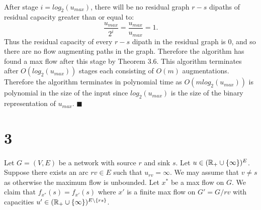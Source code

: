 \documentclass[letterpaper,12pt,oneside,onecolumn]{article}
\begin{document}
\paragraph{}
After stage $i = log_2(u_{max})$, there will be no residual graph $r-s$ dipaths of residual capacity greater than or equal to:
$$
\frac{u_{max}}{2^i} = \frac{u_{max}}{u_{max}} = 1.
$$
Thus the residual capacity of every $r-s$ dipath in the residual graph is $0$, and so there are no flow augmenting paths in the graph. Therefore the algorithm has found a max flow after this stage by Theorem $3.6$. This algorithm terminates after $O(log_2(u_{max}))$ stages each consisting of $O(m)$ augmentations. Therefore the algorithm terminates in polynomial time as $O(mlog_2(u_{max}))$ is polynomial in the size of the input since $log_2(u_{max})$ is the size of the binary representation of $u_{max}$. $\blacksquare$

\section*{3}
\paragraph{}
Let $G=(V,E)$ be a network with source $r$ and sink $s$. Let $u \in (\mathbb{R}_+ \cup \{\infty\})^E$. Suppose there exists an arc $rv \in E$ such that $u_{rv} = \infty$. We may assume that $v \neq s$ as otherwise the maximum flow is unbounded. Let $x^*$ be a max flow on $G$. We claim that $f_{x^*}(s) = f_{x'}(s)$ where $x'$ is a finite max flow on $G'=G/rv$ with capacities $u' \in (\mathbb{R}_+ \cup \{\infty\})^{E\backslash\{rs\}}$.
\end{document}
